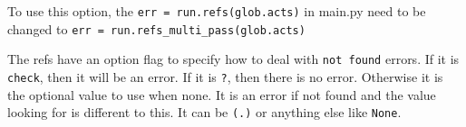 To use this option, the \texttt{err\ =\ run.refs(glob.acts)} in main.py
need to be changed to \texttt{err\ =\ run.refs\_multi\_pass(glob.acts)}

The refs have an option flag to specify how to deal with
\texttt{not\ found} errors. If it is \texttt{check}, then it will be an
error. If it is \texttt{?}, then there is no error. Otherwise it is the
optional value to use when none. It is an error if not found and the
value looking for is different to this. It can be \texttt{(.)} or
anything else like \texttt{None}.
